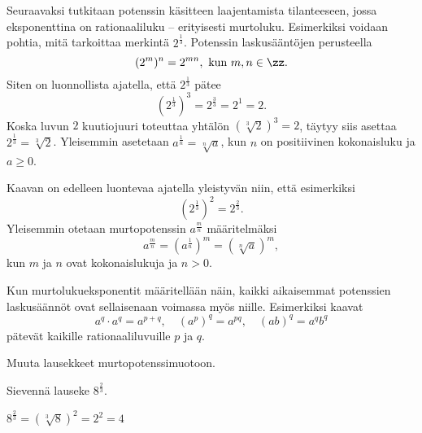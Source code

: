 Seuraavaksi tutkitaan potenssin käsitteen laajentamista tilanteeseen, jossa eksponenttina on rationaaliluku – erityisesti murtoluku. Esimerkiksi voidaan pohtia, mitä tarkoittaa merkintä $2^\frac{1}{3}$. Potenssin laskusääntöjen perusteella
\[
(2^{m})^n = 2^{mn},\textrm{ kun }m,n\in \zz.
\]
Siten on luonnollista ajatella, että  $2^\frac{1}{3}$ pätee
\[
(2^\frac{1}{3})^3 = 2^\frac{3}{3} = 2^1=2.
\]
Koska luvun $2$ kuutiojuuri toteuttaa yhtälön $(\sqrt[3]{2})^3=2$, täytyy siis asettaa $2^\frac{1}{3}=\sqrt[3]{2}$. Yleisemmin asetetaan $a^\frac{1}{n} =\sqrt[n]{a}$, kun $n$ on positiivinen kokonaisluku ja $a\ge 0$.

Kaavan on edelleen luontevaa ajatella yleistyvän niin, että esimerkiksi
\[
(2^{\frac{1}{3}})^2 = 2^{\frac{2}{3}}.
\]
Yleisemmin otetaan murtopotenssin $a^\frac{m}{n}$ määritelmäksi
\[
a^\frac{m}{n} = (a^{\frac{1}{n}})^m = (\sqrt[n]{a})^m,
\]
kun $m$ ja $n$ ovat kokonaislukuja ja $n>0$. 


Kun murtolukueksponentit määritellään näin, kaikki aikaisemmat potenssien laskusäännöt ovat sellaisenaan voimassa myös niille. Esimerkiksi kaavat
\[ a^q\cdot a^q = a^{p+q}, \quad (a^p)^q = a^{pq}, \quad (ab)^q=a^qb^q \]
pätevät kaikille rationaaliluvuille $p$ ja $q$.


\begin{esimerkki}
Muuta lausekkeet murtopotenssimuotoon.
	\begin{esimratk}
	\end{esimratk}
\end{esimerkki}

\begin{esimerkki}
Sievennä lauseke $8^\frac{2}{3}$.
	\begin{esimratk}
 $8^\frac{2}{3} = (\sqrt[3]{8})^2 = 2^2 = 4$
 	\end{esimratk}
\end{esimerkki}
